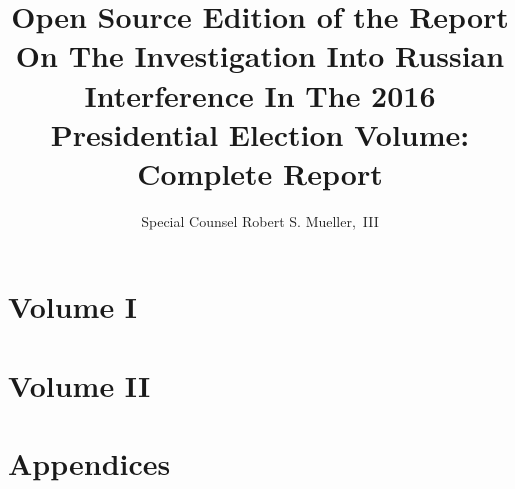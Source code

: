 \documentclass[12pt]{book}
\title{Open Source Edition of the Report On The Investigation Into Russian Interference In The 2016 Presidential Election Volume: Complete Report}
\author{Special Counsel Robert S. Mueller,~III}
\begin{document}




\chapter{Volume I}















\chapter{Volume II}













\chapter{Appendices}








\end{document}
